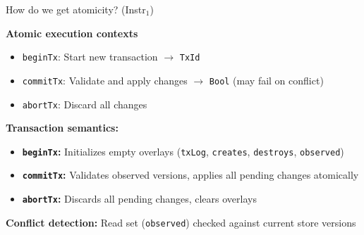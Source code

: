 \documentclass[handout,aspectratio=169,xcolor=dvipsnames,10pt]{beamer}
\begin{document}

\begin{frame}{How do we get atomicity? (Instr$_1$)}

\vfill

\textbf{Atomic execution contexts}

\begin{itemize}
  \item \texttt{beginTx}: Start new transaction $\to$ \texttt{TxId}
  \item \texttt{commitTx}: Validate and apply changes $\to$ \texttt{Bool} (may fail on conflict)
  \item \texttt{abortTx}: Discard all changes
\end{itemize}

\vspace{1em}

\textbf{Transaction semantics:}

\begin{itemize}
  \item \textbf{\texttt{beginTx}:} Initializes empty overlays (\texttt{txLog}, \texttt{creates}, \texttt{destroys}, \texttt{observed})
  \item \textbf{\texttt{commitTx}:} Validates observed versions, applies all pending changes atomically
  \item \textbf{\texttt{abortTx}:} Discards all pending changes, clears overlays
\end{itemize}

\vspace{0.5em}

\textbf{Conflict detection:} Read set (\texttt{observed}) checked against current store versions

\vfill

\end{frame}

\end{document}
